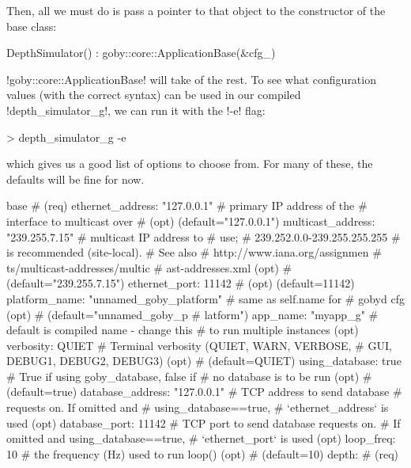 Then, all we must do is pass a pointer to that object to the constructor of the base class:
\begin{boxedverbatim}
    DepthSimulator()
        : goby::core::ApplicationBase(&cfg_)
\end{boxedverbatim}
\resetbvlinenumber
!goby::core::ApplicationBase! will take of the rest. To see what configuration values (with the correct syntax) can be used in our compiled !depth_simulator_g!, we can run it with the !-e! flag:

\begin{boxedverbatim}
> depth_simulator_g -e
\end{boxedverbatim}
\resetbvlinenumber

which gives us a good list of options to choose from. For many of these, the defaults will be fine for now.
\begin{boxedverbatim}
base {  #  (req)
  ethernet_address: "127.0.0.1"  # primary IP address of the 
                                 # interface to multicast over 
                                 # (opt) (default="127.0.0.1")
  multicast_address: "239.255.7.15"  # multicast IP address to 
                                     # use; 
                                     # 239.252.0.0-239.255.255.255 
                                     # is recommended (site-local). 
                                     # See also 
                                     # http://www.iana.org/assignmen
                                     # ts/multicast-addresses/multic
                                     # ast-addresses.xml (opt) 
                                     # (default="239.255.7.15")
  ethernet_port: 11142  #  (opt) (default=11142)
  platform_name: "unnamed_goby_platform"  # same as self.name for 
                                          # gobyd cfg (opt) 
                                          # (default="unnamed_goby_p
                                          # latform")
  app_name: "myapp_g"  # default is compiled name - change this 
                       # to run multiple instances (opt)
  verbosity: QUIET  # Terminal verbosity (QUIET, WARN, VERBOSE, 
                    # GUI, DEBUG1, DEBUG2, DEBUG3) (opt) 
                    # (default=QUIET)
  using_database: true  # True if using goby_database, false if 
                        # no database is to be run (opt) 
                        # (default=true)
  database_address: "127.0.0.1"  # TCP address to send database 
                                 # requests on. If omitted and 
                                 # using_database==true, 
                                 # `ethernet_address` is used (opt)
  database_port: 11142  # TCP port to send database requests on. 
                        # If omitted and using_database==true, 
                        # `ethernet_port` is used (opt)
  loop_freq: 10  # the frequency (Hz) used to run loop() (opt) 
                 # (default=10)
}
depth:   #  (req)
\end{boxedverbatim}
\resetbvlinenumber



